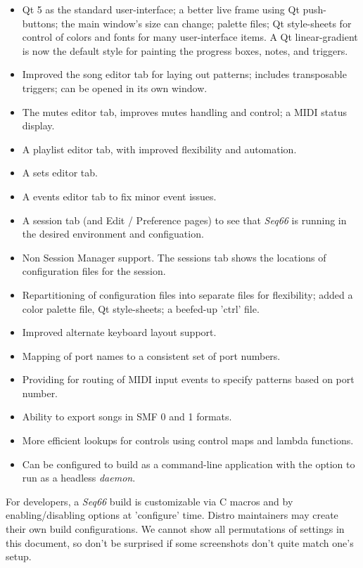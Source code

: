 \documentclass[
 11pt,
 twoside,
 a4paper,
 final                                 %
]{article}
\begin{document}
   \begin{itemize}
      \item Qt 5 as the standard user-interface;
         a better live frame using Qt push-buttons;
         the main window's size can change;
         palette files;
         Qt style-sheets for control of colors and fonts for many
         user-interface items.
         A Qt linear-gradient is now the default style for painting the
         progress boxes, notes, and triggers.
      \item Improved the song editor tab for laying out patterns;
         includes transposable triggers;
         can be opened in its own window.
      \item The mutes editor tab, improves mutes handling and control;
         a MIDI status display.
      \item A playlist editor tab, with improved flexibility and automation.
      \item A sets editor tab.
      \item A events editor tab to fix minor event issues.
      \item A session tab (and Edit / Preference pages) to see that
         \textsl{Seq66} is running in the desired environment and configuation.
      \item Non Session Manager support. The sessions tab shows the
         locations of configuration files for the session.
      \item Repartitioning of configuration files into separate files for
         flexibility; added a color palette file, Qt style-sheets; a beefed-up
         'ctrl' file.
      \item Improved alternate keyboard layout support.
      \item Mapping of port names to a consistent set of port numbers.
      \item Providing for routing of MIDI input events to specify
         patterns based on port number.
      \item Ability to export songs in SMF 0 and 1 formats.
      \item More efficient lookups for controls using control maps
         and lambda functions.
      \item Can be configured to build as a command-line application with
         the option to run as a headless \textsl{daemon}.
   \end{itemize}

   For developers, a \textsl{Seq66} build is customizable via C macros and by
   enabling/disabling options at 'configure' time.
   Distro maintainers may create their own build configurations.
   We cannot show all permutations of settings in this document,
   so don't be surprised if some screenshots don't quite match one's setup.
\end{document}
